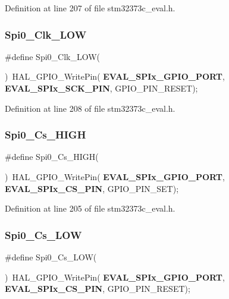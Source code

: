 Definition at line 207 of file stm32373c\+\_\+eval.\+h.

\mbox{\label{group___l_e_d_gad432385059d20a023ee2ece12e32c92d}} 
\subsubsection{Spi0\+\_\+\+Clk\+\_\+\+L\+OW}
{\footnotesize\ttfamily \#define Spi0\+\_\+\+Clk\+\_\+\+L\+OW(\begin{DoxyParamCaption}{ }\end{DoxyParamCaption})~H\+A\+L\+\_\+\+G\+P\+I\+O\+\_\+\+Write\+Pin(\textbf{ E\+V\+A\+L\+\_\+\+S\+P\+Ix\+\_\+\+G\+P\+I\+O\+\_\+\+P\+O\+RT},\textbf{ E\+V\+A\+L\+\_\+\+S\+P\+Ix\+\_\+\+S\+C\+K\+\_\+\+P\+IN}, G\+P\+I\+O\+\_\+\+P\+I\+N\+\_\+\+R\+E\+S\+ET);}



Definition at line 208 of file stm32373c\+\_\+eval.\+h.

\mbox{\label{group___l_e_d_ga43c85b0d7d638c8bd5e2dcf182e3da3b}} 
\subsubsection{Spi0\+\_\+\+Cs\+\_\+\+H\+I\+GH}
{\footnotesize\ttfamily \#define Spi0\+\_\+\+Cs\+\_\+\+H\+I\+GH(\begin{DoxyParamCaption}{ }\end{DoxyParamCaption})~H\+A\+L\+\_\+\+G\+P\+I\+O\+\_\+\+Write\+Pin(\textbf{ E\+V\+A\+L\+\_\+\+S\+P\+Ix\+\_\+\+G\+P\+I\+O\+\_\+\+P\+O\+RT},\textbf{ E\+V\+A\+L\+\_\+\+S\+P\+Ix\+\_\+\+C\+S\+\_\+\+P\+IN}, G\+P\+I\+O\+\_\+\+P\+I\+N\+\_\+\+S\+ET);}



Definition at line 205 of file stm32373c\+\_\+eval.\+h.

\mbox{\label{group___l_e_d_ga5d1d44c99f4b418d0a8dd93f465e95f5}} 
\subsubsection{Spi0\+\_\+\+Cs\+\_\+\+L\+OW}
{\footnotesize\ttfamily \#define Spi0\+\_\+\+Cs\+\_\+\+L\+OW(\begin{DoxyParamCaption}{ }\end{DoxyParamCaption})~H\+A\+L\+\_\+\+G\+P\+I\+O\+\_\+\+Write\+Pin(\textbf{ E\+V\+A\+L\+\_\+\+S\+P\+Ix\+\_\+\+G\+P\+I\+O\+\_\+\+P\+O\+RT},\textbf{ E\+V\+A\+L\+\_\+\+S\+P\+Ix\+\_\+\+C\+S\+\_\+\+P\+IN}, G\+P\+I\+O\+\_\+\+P\+I\+N\+\_\+\+R\+E\+S\+ET);}



